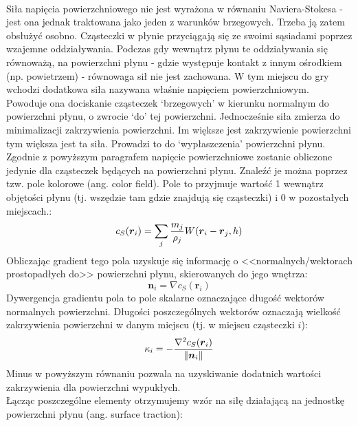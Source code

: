 \paragraph{}
Siła napięcia powierzchniowego nie jest wyrażona w równaniu Naviera-Stokesa - jest ona jednak traktowana jako jeden z warunków brzegowych. Trzeba ją zatem obsłużyć osobno. Cząsteczki w płynie przyciągają się ze swoimi sąsiadami poprzez wzajemne oddziaływania. Podczas gdy wewnątrz płynu te oddziaływania się równoważą, na powierzchni płynu - gdzie występuje kontakt z innym ośrodkiem (np. powietrzem) - równowaga sił nie jest zachowana. W tym miejscu do gry wchodzi dodatkowa siła nazywana właśnie napięciem powierzchniowym. Powoduje ona dociskanie cząsteczek `brzegowych' w kierunku normalnym do powierzchni płynu, o zwrocie `do' tej powierzchni. Jednocześnie siła zmierza do minimalizacji zakrzywienia powierzchni. Im większe jest zakrzywienie powierzchni tym większa jest ta siła. Prowadzi to do `wypłaszczenia' powierzchni płynu.\\
Zgodnie z powyższym paragrafem napięcie powierzchniowe zostanie obliczone jedynie dla cząsteczek będących na powierzchni płynu. Znaleźć je można poprzez tzw. pole kolorowe (ang. color field). Pole to przyjmuje wartość 1 wewnątrz objętości płynu (tj. wszędzie tam gdzie znajdują się cząsteczki) i 0 w pozostałych miejscach.:
\begin{equation}
{c}_S(\boldsymbol{r}_i) = \sum\limits_{j} {m_j \over \rho_j} W(\boldsymbol{r}_i-\boldsymbol{r}_j, h)
\label{eqn:color_field}
\end{equation}
Obliczając gradient tego pola uzyskuje się informację o <<normalnych/wektorach prostopadłych do>> powierzchni płynu, skierowanych do jego wnętrza:
\begin{equation}
\boldsymbol{n}_i = \nabla{c}_S(\boldsymbol{r}_i)
\label{eqn:color_field_grad}
\end{equation}
Dywergencja gradientu pola to pole skalarne oznaczające długość wektorów normalnych powierzchni. Długości poszczególnych wektorów oznaczają wielkość zakrzywienia powierzchni w danym miejscu (tj. w miejscu cząsteczki $i$):
\begin{equation}
\kappa_i = -{\nabla^2{c}_S(\boldsymbol{r}_i) \over \|\boldsymbol{n}_i\|}
\label{eqn:color_field_div}
\end{equation}
Minus w powyższym równaniu pozwala na uzyskiwanie dodatnich wartości zakrzywienia dla powierzchni wypukłych.\\
Łącząc poszczególne elementy otrzymujemy wzór na siłę działającą na jednostkę powierzchni płynu (ang. surface traction):
